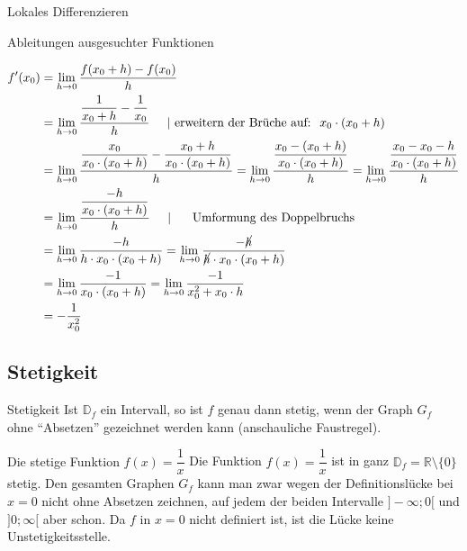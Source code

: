 \begin{section}{Lokales Differenzieren}
\begin{bsp*}{Ableitungen ausgesuchter Funktionen}{}
\begin{itemize}
\begin{equation*}
\begin{split}
f'(x_0)&= \lim_{h\rightarrow 0} \dfrac{f(x_0 +h) - f(x_0)}{h}\\
&= \lim_{h\rightarrow 0} \dfrac{\dfrac{1}{x_0 + h} -\dfrac{1}{x_0}}{h} \hspace{0.5cm} | \text{ erweitern der Brüche auf: }\hspace{0.1cm} x_0 \cdot (x_0 + h) \\
&= \lim_{h\rightarrow 0} \dfrac{\dfrac{x_0}{x_0\cdot (x_0 + h)} -\dfrac{x_0 + h}{x_0\cdot (x_0 + h)}}{h} 
= \lim_{h\rightarrow 0} \dfrac{\dfrac{x_0 - (x_0 +h)}{x_0\cdot (x_0 + h)}}{h}
= \lim_{h\rightarrow 0} \dfrac{\dfrac{x_0 - x_0 -h}{x_0\cdot (x_0 + h)}}{h}\\
&= \lim_{h\rightarrow 0} \dfrac{\dfrac{-h}{x_0\cdot (x_0 + h)}}{h} \hspace{0.5cm} | \hspace{0.5cm}\text{ Umformung des Doppelbruchs } \\
&= \lim_{h\rightarrow 0} \dfrac{-h}{h\cdot x_0\cdot (x_0 + h)}
= \lim_{h\rightarrow 0} \dfrac{-\cancel{h}}{\cancel{h}\cdot x_0\cdot (x_0 + h)}\\
&=\lim_{h\rightarrow 0} \dfrac{-1}{x_0\cdot (x_0 + h)} = \lim_{h\rightarrow 0} \dfrac{-1}{x^2_0 + x_0\cdot h}\\
&= -\dfrac{1}{x^2_0}
\end{split}
\end{equation*}
\end{itemize}
\end{bsp*}
\subsection{Stetigkeit}
\begin{merke}{Stetigkeit}{}
    Ist \(\mathds{D}_f\) ein Intervall, so ist \(f\) genau dann stetig, wenn der Graph \(G_f\) ohne \enquote{Absetzen} gezeichnet werden kann (anschauliche Faustregel).
\end{merke}
\begin{bsp}{Die stetige Funktion \(f(x) = \dfrac{1}{x}\)}{}
Die Funktion \(f(x)= \dfrac{1}{x}\) ist in ganz \(\mathds{D}_f = \mathds{R}\setminus\{0\} \) stetig. Den gesamten Graphen \(G_f\) kann man zwar wegen der Definitionslücke bei \(x=0\) nicht ohne Absetzen zeichnen, auf jedem der beiden Intervalle \(]-\infty;0[\) und \(]0;\infty[\) aber schon. Da \(f\) in \(x=0\) nicht definiert ist, ist die Lücke keine Unstetigkeitsstelle.
\begin{center}
\end{center}
\end{bsp}
\end{section}
